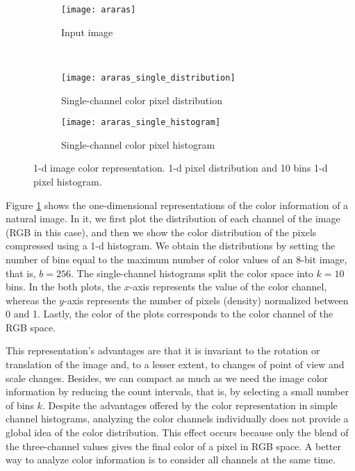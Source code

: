\begin{figure}[!ht]

	\centering
    \begin{subfigure}[b]{0.25\textwidth}
        \texttt{[image: araras]}
        \caption{Input image}
    \end{subfigure} \\
       
    \begin{subfigure}[b]{0.49\textwidth}
        \texttt{[image: araras\_single\_distribution]}
        \caption{Single-channel color pixel distribution}
    \end{subfigure} 
    \begin{subfigure}[b]{0.49\textwidth}
        \texttt{[image: araras\_single\_histogram]}
        \caption{Single-channel color pixel histogram}
    \end{subfigure}    
    
    \caption{1-d image color representation. 1-d pixel distribution and 10 bins 1-d pixel histogram.}\label{fig:single_channel_histogram}    
\end{figure}

Figure \ref{fig:single_channel_histogram} shows the one-dimensional representations of the color information of a natural image. In it, we first plot the distribution of each channel of the image (RGB in this case), and then we show the color distribution of the pixels compressed using a 1-d histogram. We obtain the distributions by setting the number of bins equal to the maximum number of color values of an 8-bit image, that is, $b = 256$. The single-channel histograms split the color space into $k=10$ bins. In the both plots, the $x$-axis represents the value of the color channel, whereas the $y$-axis represents the number of pixels (density) normalized between 0 and 1. Lastly, the color of the plots corresponds to the color channel of the RGB space.

This representation's advantages are that it is invariant to the rotation or translation of the image and, to a lesser extent, to changes of point of view and scale changes. Besides, we can compact as much as we need the image color information by reducing the count intervals, that is, by selecting a small number of bins $k$. Despite the advantages offered by the color representation in simple channel histograms, analyzing the color channels individually does not provide a global idea of the color distribution. This effect occurs because only the blend of the three-channel values gives the final color of a pixel in RGB space. A better way to analyze color information is to consider all channels at the same time.


